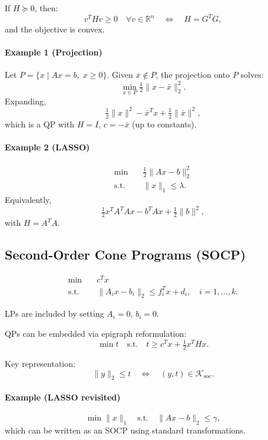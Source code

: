 \documentclass[12pt,oneside]{book}
\numberwithin{equation}{section}
\theoremstyle{definition}
\theoremstyle{plain}
\theoremstyle{remark}
\begin{document}
If $H \succeq 0$, then:
\[
v^T H v \ge 0 \quad \forall v \in \mathbb{R}^n
\quad \Longleftrightarrow \quad
H = G^T G,
\]
and the objective is convex.

\paragraph{Example 1 (Projection)}
Let $P = \{x \mid Ax = b,\; x \ge 0\}$. Given $\bar{x} \notin P$, the projection onto $P$ solves:
\[
\min_{x \in P} \tfrac{1}{2} \|x - \bar{x}\|_2^2.
\]
Expanding,
\[
\tfrac{1}{2}\|x\|^2 - \bar{x}^T x + \tfrac{1}{2}\|\bar{x}\|^2,
\]
which is a QP with $H = I$, $c = -\bar{x}$ (up to constants).

\paragraph{Example 2 (LASSO)}
\[
\begin{aligned}
\min \quad & \tfrac{1}{2}\|Ax - b\|_2^2 \\
\text{s.t.} \quad & \|x\|_1 \le \lambda.
\end{aligned}
\]
Equivalently,
\[
\tfrac{1}{2} x^T A^T A x - b^T A x + \tfrac{1}{2}\|b\|^2,
\]
with $H = A^T A$.

\subsection{Second-Order Cone Programs (SOCP)}

\[
\begin{aligned}
\min \quad & c^T x \\
\text{s.t.} \quad & \|A_i x - b_i\|_2 \le f_i^T x + d_i, \quad i=1,\dots,k.
\end{aligned}
\]

LPs are included by setting $A_i = 0$, $b_i = 0$.

QPs can be embedded via epigraph reformulation:
\[
\min t \quad \text{s.t.} \quad t \ge c^T x + \tfrac{1}{2}x^T H x.
\]

Key representation:
\[
\|y\|_2 \le t \quad \Longleftrightarrow \quad (y,t) \in \mathcal{K}_{\text{soc}}.
\]

\paragraph{Example (LASSO revisited)}
\[
\min \|x\|_1 \quad \text{s.t.} \quad \|Ax - b\|_2 \le \gamma,
\]
which can be written as an SOCP using standard transformations.
\end{document}
